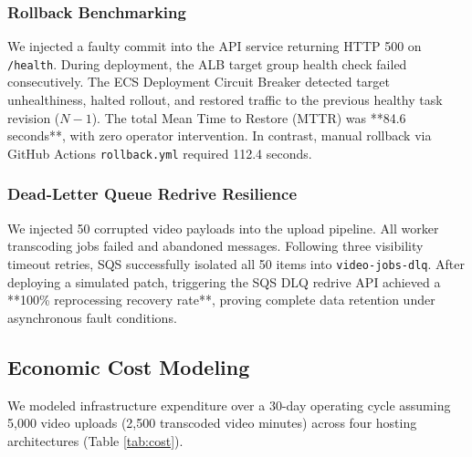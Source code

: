 \documentclass[conference]{IEEEtran}
\begin{document}
\subsubsection{Rollback Benchmarking}
We injected a faulty commit into the API service returning HTTP 500 on \texttt{/health}. During deployment, the ALB target group health check failed consecutively. The ECS Deployment Circuit Breaker detected target unhealthiness, halted rollout, and restored traffic to the previous healthy task revision ($N-1$). The total Mean Time to Restore (MTTR) was **84.6 seconds**, with zero operator intervention. In contrast, manual rollback via GitHub Actions \texttt{rollback.yml} required 112.4 seconds.

\subsubsection{Dead-Letter Queue Redrive Resilience}
We injected 50 corrupted video payloads into the upload pipeline. All worker transcoding jobs failed and abandoned messages. Following three visibility timeout retries, SQS successfully isolated all 50 items into \texttt{video-jobs-dlq}. After deploying a simulated patch, triggering the SQS DLQ redrive API achieved a **100\% reprocessing recovery rate**, proving complete data retention under asynchronous fault conditions.

\subsection{Economic Cost Modeling}
We modeled infrastructure expenditure over a 30-day operating cycle assuming 5,000 video uploads (2,500 transcoded video minutes) across four hosting architectures (Table \ref{tab:cost}).
\end{document}
